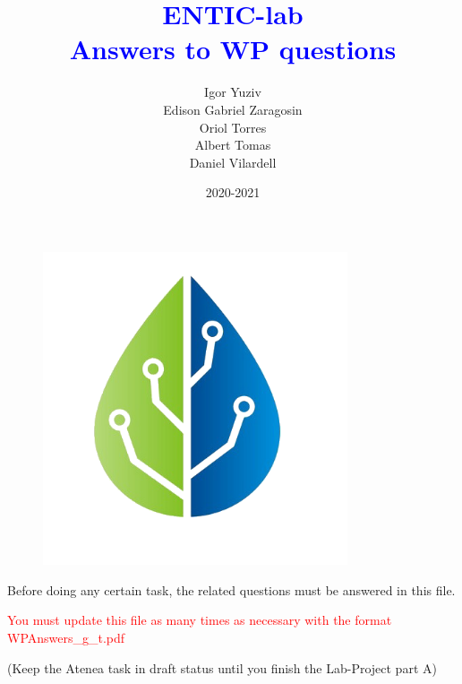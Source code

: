 \documentclass[12pt, a4papre]{article}
\author{	
		Igor Yuziv\\
		Edison Gabriel Zaragosin\\
		Oriol Torres\\
		Albert Tomas\\
		Daniel Vilardell}
\title{\textbf{\textcolor{blue}{ENTIC-lab\\
	Answers to WP questions}}}
\date{2020-2021}
\begin{document}
	
	\maketitle
	\begin{figure}[H]
		\begin{center}
		\includegraphics[width=90mm]{LogoSenseBlanc.png}
		\end{center}
	\end{figure}
	
	\newpage
	\tableofcontents
	\newpage
	\begin{center}
	\footnotesize{
		Before doing any certain task, the related questions must be answered in this file.
		
		\textcolor{red}{You must update this file as many times as necessary with the format WPAnswers\_g\_t.pdf}
		
 		(Keep the Atenea task in draft status until you finish the Lab-Project part A)
		}
	\end{center}
\end{document}
